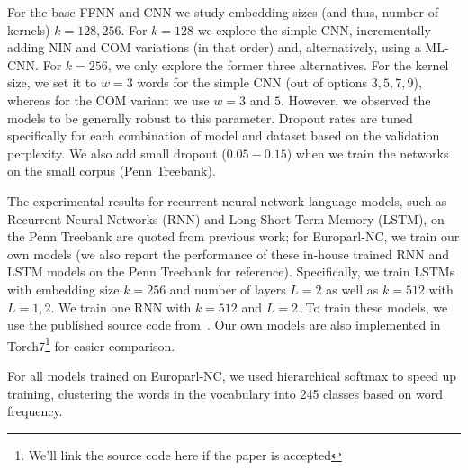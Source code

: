 For the base FFNN and CNN we study embedding sizes (and thus, number of kernels) $k=128,256$. For $k=128$ we explore the simple CNN, incrementally adding NIN and COM variations (in that order) and, alternatively, using a ML-CNN. For $k=256$, we only explore the former three alternatives. For the kernel size, we set it to $w=3$ words for the simple CNN (out of options $3,5,7,9$), whereas for the COM variant we use $w=3$ and $5$. However, we observed the models to be generally robust to this parameter. Dropout rates are tuned specifically for each combination of model and dataset based on the validation perplexity. We also add small dropout ($0.05-0.15$) when we train the networks on the small corpus (Penn Treebank). 


The experimental results for recurrent neural network language models,
such as Recurrent Neural Networks (RNN) and Long-Short Term Memory (LSTM), on the Penn Treebank are quoted from previous
work; for Europarl-NC, we train our own models (we also report the
performance of these in-house trained RNN and LSTM models on the Penn Treebank for
reference). Specifically, we train LSTMs with embedding size $k=256$
and number of layers $L=2$ as well as $k=512$ with $L=1,2$. We train
one RNN with $k=512$ and $L=2$. To train these models, we use the
published source code from~\cite{zaremba2014recurrent}. Our own models are also
implemented in Torch7\footnote{We'll link the source code here if the paper is accepted} %
	for easier comparison.

 For all models trained on Europarl-NC, we used hierarchical softmax to
speed up training, clustering the words in the vocabulary into 245
classes based on word frequency.


